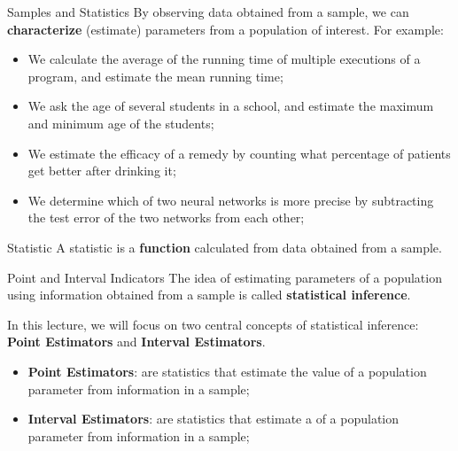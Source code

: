 \begin{frame}{Samples and Statistics}
  By observing data obtained from a sample, we can {\bf characterize} (estimate) parameters from a population of interest. For example:\bigskip

  \begin{itemize}
    \item We calculate the average of the running time of multiple executions of a program, and estimate the mean running time;
    \item We ask the age of several students in a school, and estimate the maximum and minimum age of the students;
    \item We estimate the efficacy of a remedy by counting what percentage of patients get better after drinking it;
    \item We determine which of two neural networks is more precise by subtracting the test error of the two networks from each other;
  \end{itemize}\bigskip

  \begin{block}{Statistic}
    A statistic is a {\bf function} calculated from data obtained from a sample.
  \end{block}
\end{frame}

\begin{frame}{Point and Interval Indicators}
  The idea of estimating parameters of a population using information
  obtained from a sample is called {\bf statistical inference}.
  \bigskip

  In this lecture, we will focus on two central concepts of statistical inference: {\bf Point Estimators} and {\bf Interval Estimators}.\bigskip

  \begin{itemize}
    \item {\bf Point Estimators}: are statistics that estimate the value of a population parameter from information in a sample;

    \item {\bf Interval Estimators}: are statistics that estimate a  of a population parameter from information in a sample;
  \end{itemize}
\end{frame}

